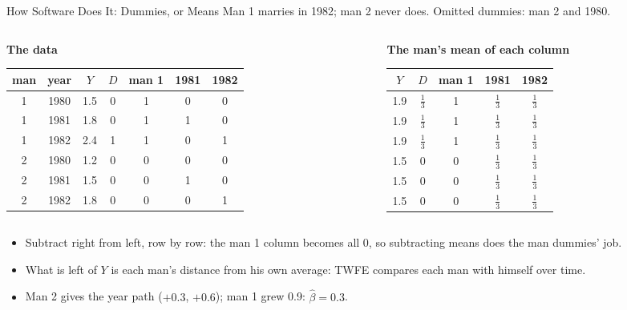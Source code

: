 \documentclass[aspectratio=169,11pt,xcolor=dvipsnames]{beamer}
\begin{document}
\begin{frame}{How Software Does It: Dummies, or Means}
Man 1 marries in 1982; man 2 never does. Omitted dummies: man 2 and 1980.
\begin{columns}[t]
\begin{column}{0.53\linewidth}
\centering\footnotesize
\textbf{The data}\\[2pt]
\renewcommand{\arraystretch}{1.0}\setlength{\tabcolsep}{3.5pt}
\begin{tabular}{@{}cc|cc|ccc@{}}
\toprule
man & year & $Y$ & $D$ & man 1 & 1981 & 1982 \\
\midrule
1 & 1980 & 1.5 & 0 & 1 & 0 & 0 \\
1 & 1981 & 1.8 & 0 & 1 & 1 & 0 \\
1 & 1982 & 2.4 & 1 & 1 & 0 & 1 \\
2 & 1980 & 1.2 & 0 & 0 & 0 & 0 \\
2 & 1981 & 1.5 & 0 & 0 & 1 & 0 \\
2 & 1982 & 1.8 & 0 & 0 & 0 & 1 \\
\bottomrule
\end{tabular}
\end{column}
\begin{column}{0.45\linewidth}
\centering\footnotesize
\textbf{The man's mean of each column}\\[2pt]
\renewcommand{\arraystretch}{1.0}\setlength{\tabcolsep}{3.5pt}
\begin{tabular}{@{}cc|ccc@{}}
\toprule
$Y$ & $D$ & man 1 & 1981 & 1982 \\
\midrule
1.9 & $\tfrac13$ & 1 & $\tfrac13$ & $\tfrac13$ \\
1.9 & $\tfrac13$ & 1 & $\tfrac13$ & $\tfrac13$ \\
1.9 & $\tfrac13$ & 1 & $\tfrac13$ & $\tfrac13$ \\
1.5 & 0 & 0 & $\tfrac13$ & $\tfrac13$ \\
1.5 & 0 & 0 & $\tfrac13$ & $\tfrac13$ \\
1.5 & 0 & 0 & $\tfrac13$ & $\tfrac13$ \\
\bottomrule
\end{tabular}
\end{column}
\end{columns}
\vskip1pt
\begin{itemize}\itemsep1pt
  \item Subtract right from left, row by row: the man 1 column becomes all 0, so
        subtracting means does the man dummies' job.
  \item What is left of $Y$ is each man's distance from his own average:
        \alert{TWFE compares each man with himself over time.}
  \item Man 2 gives the year path ($+0.3$, $+0.6$); man 1 grew 0.9: $\hat\beta = 0.3$.
\end{itemize}
\end{frame}
\end{document}
